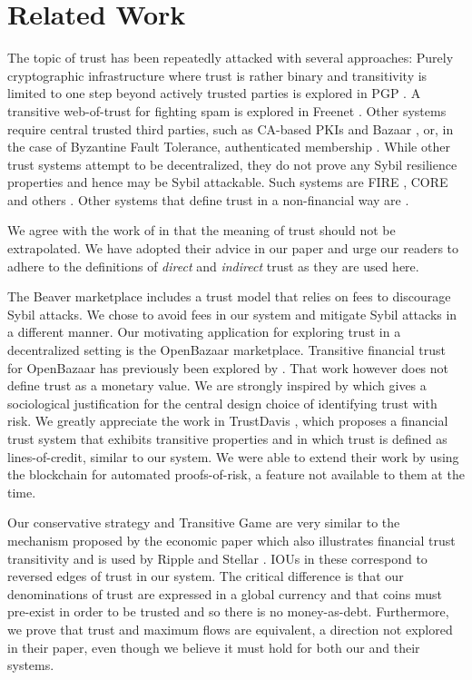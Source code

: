 \section{Related Work}
  The topic of trust has been repeatedly attacked with several approaches: Purely cryptographic infrastructure where trust
  is rather binary and transitivity is limited to one step beyond actively trusted parties is explored in PGP \cite{pgp}. A
  transitive web-of-trust for fighting spam is explored in Freenet \cite{freenet}. Other systems require central trusted
  third parties, such as CA-based PKIs \cite{pki} and Bazaar \cite{bazaar}, or, in the case of Byzantine Fault Tolerance,
  authenticated membership \cite{byzantine}. While other trust systems attempt to be decentralized, they do not prove any
  Sybil resilience properties and hence may be Sybil attackable. Such systems are FIRE \cite{fire}, CORE \cite{core} and
  others \cite{openrep,ghkkw,rk}. Other systems that define trust in a non-financial way are
  \cite{mui,beta,pace,vpc,sdt,wot,pathfinder}.

  We agree with the work of \cite{badtrust} in that the meaning of trust should not be extrapolated. We have adopted their
  advice in our paper and urge our readers to adhere to the definitions of \textit{direct} and \textit{indirect} trust as
  they are used here.

  The Beaver marketplace \cite{beaver} includes a trust model that relies on
  fees to discourage Sybil attacks. We chose to avoid fees in our system and mitigate Sybil attacks in a different manner.
  Our motivating application for exploring trust in a decentralized setting is the OpenBazaar marketplace. Transitive
  financial trust for OpenBazaar has previously been explored by \cite{dionyziz}. That work however does not define trust
  as a monetary value. We are strongly inspired by \cite{kmrs}
  which gives a sociological justification for the central design choice of identifying trust with
  risk. We greatly appreciate the work in TrustDavis \cite{davis}, which proposes a financial trust system that exhibits
  transitive properties and in which trust is defined as lines-of-credit, similar to our system. We were able to extend
  their work by using the blockchain for automated proofs-of-risk, a feature not available to them at the time.

  Our conservative strategy and Transitive Game are very similar to the mechanism proposed by the economic paper
  \cite{iou} which also illustrates financial trust transitivity and is used by Ripple \cite{ripple} and Stellar
  \cite{stellar}.  IOUs in these correspond to reversed edges of trust in our system. The critical difference is that our
  denominations of trust are expressed in a global currency and that coins must pre-exist in order to be trusted and so there
  is no money-as-debt. Furthermore, we prove that trust and maximum flows are equivalent, a direction not explored in their
  paper, even though we believe it must hold for both our and their systems.
